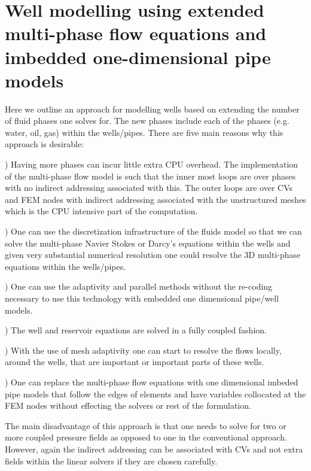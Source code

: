 \pagebreak




\section{Well modelling using extended multi-phase flow equations
and imbedded one-dimensional pipe models}
\label{Well modelling using extended multi-phase flow equations}
Here we outline an approach for modelling wells based on extending the number of
fluid phases one solves for. The new phases include each of the phases (e.g. water, oil, gas)
within the wells/pipes. There are five main reasons why this approach is desirable:
\par{}) Having more phases can incur little extra CPU overhead.
The implementation of the multi-phase flow model is such that the inner most loops
are over phases with no indirect addressing associated with this. The outer loops
are over CVs and FEM nodes with indirect addressing associated with the unstructured meshes
which is the CPU intensive part of the
computation.
\par{}) One can use the discretization infrastructure of the fluids model so that we can solve the
multi-phase
Navier Stokes or Darcy's equations within the wells and given very substantial numerical
resolution one could resolve the 3D multi-phase equations within the wells/pipes.
\par{}) One can use the adaptivity and parallel methods without the re-coding necessary
to use this technology with embedded one dimensional pipe/well models.
\par{}) The well and reservoir equations are solved in a fully coupled fashion.
\par{}) With the use of mesh adaptivity one can start to resolve the flows locally, around the
wells, that are important or important parts of these wells.
\par{}) One can replace the multi-phase flow equations with one dimensional imbeded pipe models that
follow the edges of elements and have variables collocated at the FEM nodes without
effecting the solvers or rest of the formulation.

The main disadvantage of this approach is that one needs to solve for two or more
coupled pressure fields as opposed to one in the conventional approach.
However, again the indirect addressing can be associated with CVs and not
extra fields within the linear solvers if they are chosen carefully.

